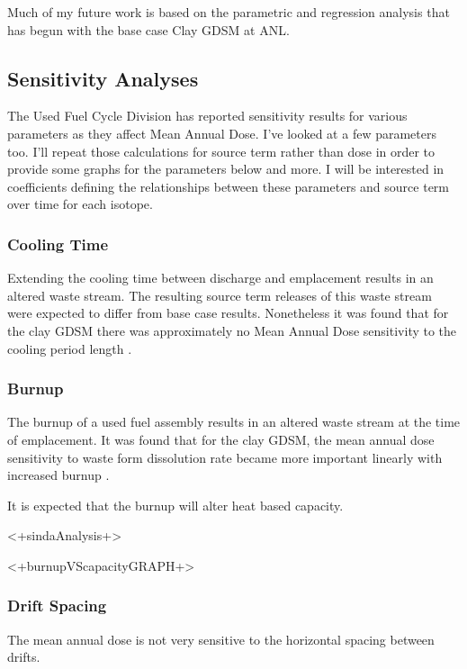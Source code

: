 Much of my future work is based on the parametric and regression analysis that
has begun with the base case Clay \gls{GDSM} at \gls{ANL}.

\subsection{Sensitivity Analyses}

The Used Fuel Cycle Division has reported sensitivity results for various 
parameters as they affect Mean Annual Dose. I've looked at a 
few parameters too. I'll repeat those calculations for source term rather than 
dose in order to provide some graphs for the parameters below and more. I will 
be interested in coefficients defining the relationships between these 
parameters and source term over time for each isotope. 

\subsubsection{Cooling Time}

Extending the cooling time between discharge and emplacement results
in an altered waste stream. The resulting source term releases
of this waste stream were expected to differ from base case results. 
Nonetheless it was found that for the clay \gls{GDSM} there was approximately 
no Mean Annual Dose sensitivity to the cooling period length 
\cite{clayton_generic_2011}.

\subsubsection{Burnup}

The burnup of a used fuel assembly results in an altered waste stream at the 
time of emplacement. It was found that for the clay \gls{GDSM}, the mean 
annual dose sensitivity to waste form dissolution rate became more important 
linearly with increased burnup \cite{clayton_generic_2011}.

It is expected that the burnup will alter heat based capacity. 

<+sindaAnalysis+>

<+burnupVScapacityGRAPH+>


\subsubsection{Drift Spacing}

The mean annual dose is not very sensitive to the horizontal spacing between 
drifts. 

